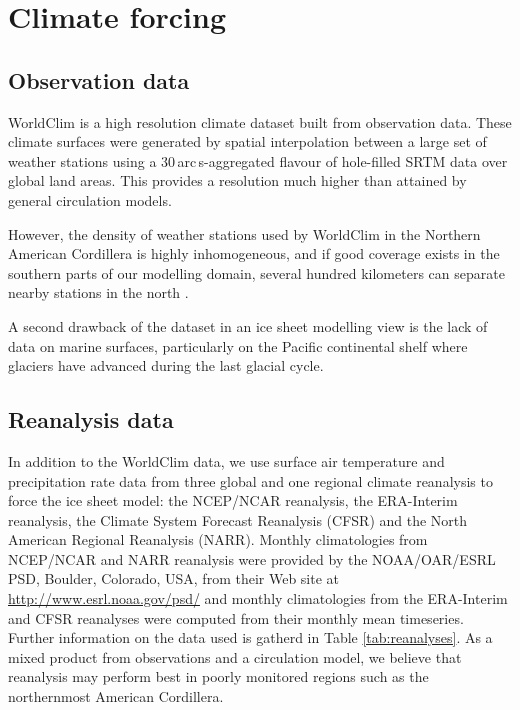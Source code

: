 
\section{Climate forcing}
\label{sec:climate}

\subsection{Observation data}

WorldClim \citep{data:worldclim} is a high resolution climate dataset built from observation data. These climate surfaces were generated by spatial interpolation between a large set of weather stations using a 30\,arc\,s-aggregated flavour of hole-filled SRTM data over global land areas. This provides a resolution much higher than attained by general circulation models.

However, the density of weather stations used by WorldClim in the Northern American Cordillera is highly inhomogeneous, and if good coverage exists in the southern parts of our modelling domain, several hundred kilometers can separate nearby stations in the north \citep{data:worldclim}.

A second drawback of the dataset in an ice sheet modelling view is the lack of data on marine surfaces, particularly on the Pacific continental shelf where glaciers have advanced during the last glacial cycle\needref.


\subsection{Reanalysis data}

In addition to the WorldClim data, we use surface air temperature and precipitation rate data from three global and one regional climate reanalysis to force the ice sheet model: the NCEP/NCAR reanalysis, the ERA-Interim reanalysis, the Climate System Forecast Reanalysis (CFSR) and the North American Regional Reanalysis (NARR). Monthly climatologies from NCEP/NCAR and NARR reanalysis were provided by the NOAA/OAR/ESRL PSD, Boulder, Colorado, USA, from their Web site at \url{http://www.esrl.noaa.gov/psd/} and monthly climatologies from the ERA-Interim and CFSR reanalyses were computed from their monthly mean timeseries. Further information on the data used is gatherd in Table \ref{tab:reanalyses}. As a mixed product from observations and a circulation model, we believe that reanalysis may perform best in poorly monitored regions such as the northernmost American Cordillera.


